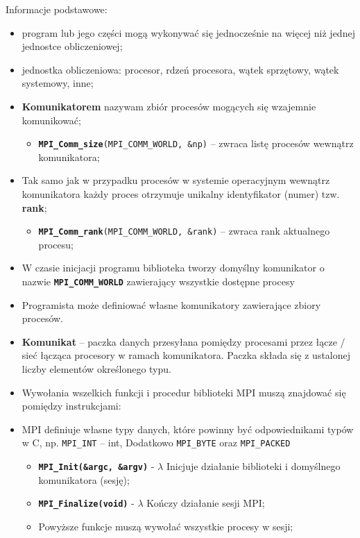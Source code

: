 Informacje podstawowe: 
\begin{itemize}
\item program lub jego części mogą wykonywać się jednocześnie na więcej niż jednej jednostce obliczeniowej;
\item jednostka obliczeniowa: procesor, rdzeń procesora, wątek sprzętowy, wątek systemowy, inne;
\item \textbf{Komunikatorem} nazywam zbiór procesów mogących się wzajemnie komunikować;
\begin{itemize}
\item \texttt{\textbf{MPI\_Comm\_size}(MPI\_COMM\_WORLD, \&np)} -- zwraca listę procesów wewnątrz komunikatora;
\end{itemize}
\item Tak samo jak w przypadku procesów w systemie operacyjnym wewnątrz komunikatora każdy proces otrzymuje unikalny identyfikator (numer) tzw. \textbf{rank};
\begin{itemize}
\item \texttt{\textbf{MPI\_Comm\_rank}(MPI\_COMM\_WORLD, \&rank)} -- zwraca rank aktualnego procesu;
\end{itemize}
\item W czasie inicjacji programu biblioteka tworzy domyślny komunikator o nazwie \texttt{\textbf{MPI\_COMM\_WORLD}} zawierający wszystkie dostępne procesy
\item Programista może definiować własne komunikatory zawierające zbiory procesów.
\item \textbf{Komunikat} -- paczka danych przesyłana pomiędzy procesami przez łącze / sieć łącząca procesory w ramach komunikatora. Paczka składa się z ustalonej liczby elementów określonego typu.
\item Wywołania wszelkich funkcji i procedur biblioteki MPI muszą znajdować się pomiędzy instrukcjami:
\item MPI definiuje własne typy danych, które powinny być odpowiednikami typów w C, np. \texttt{MPI\_INT} -- int, Dodatkowo \texttt{MPI\_BYTE} oraz \texttt{MPI\_PACKED}
\begin{itemize}
\item \texttt{\textbf{MPI\_Init(\&argc, \&argv)}} - $\lambda$ Inicjuje działanie biblioteki i domyślnego komunikatora (sesję);
\item \texttt{\textbf{MPI\_Finalize(void)}} - $\lambda$ Kończy działanie sesji MPI;
\item Powyższe funkcje muszą wywołać wszystkie procesy w sesji;
\end{itemize}
\end{itemize}

